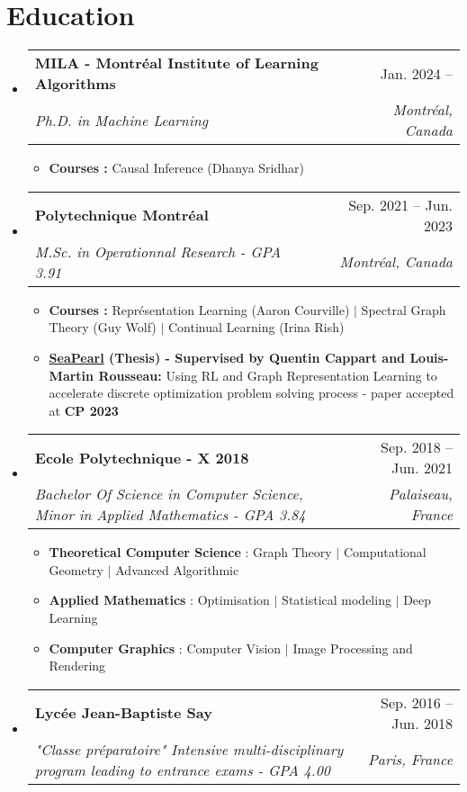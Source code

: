 \documentclass[letterpaper,11pt]{article}
\makeatletter
\newcommand{\resumeSubheading}[4]{
  \vspace{-2pt}\item
    \begin{tabular*}{0.97\textwidth}[t]{l@{\extracolsep{\fill}}r}
      \textbf{#1} & #2 \\
      \textit{\small#3} & \textit{\small #4} \\
    \end{tabular*}\vspace{-7pt}
}
\newcommand{\resumeSubHeadingListStart}{\begin{itemize}[leftmargin=0.15in, label={}]}
\newcommand{\resumeSubHeadingListEnd}{\end{itemize}}
\makeatother
\begin{document}
\section{Education}
  \resumeSubHeadingListStart
        \resumeSubheading
      {MILA - Montréal Institute of Learning Algorithms}{Jan. 2024 -- }
      {Ph.D. in Machine Learning}{Montréal, Canada}
      \vspace{.2pt}
      \begin{itemize}
          \item \textbf{Courses :} Causal Inference (Dhanya Sridhar)
      \end{itemize}
      \resumeSubheading
      {Polytechnique Montréal}{Sep. 2021 -- Jun. 2023}
      {M.Sc. in Operationnal Research - GPA 3.91}{Montréal, Canada}
      \vspace{.2pt}
      \begin{itemize}
          \item \textbf{Courses :} Représentation Learning (Aaron Courville) $|$ Spectral Graph Theory (Guy Wolf) $|$ Continual Learning (Irina Rish)  
          \item \textbf{\href{https://github.com/corail-research/SeaPearl.jl}{SeaPearl} (Thesis) - Supervised by Quentin Cappart and Louis-Martin Rousseau:} Using RL and Graph Representation Learning to accelerate discrete optimization problem solving process - paper accepted at \textbf{CP 2023}
      \end{itemize}
    \resumeSubheading
      {Ecole Polytechnique - X 2018}{Sep. 2018 -- Jun. 2021}
      {Bachelor Of Science in Computer Science, Minor in Applied Mathematics - GPA 3.84}{Palaiseau, France}
      \vspace{.2pt}
      \begin{itemize}
          \item \textbf{Theoretical Computer Science} : Graph Theory $|$ Computational Geometry $|$ Advanced Algorithmic
          \item \textbf{Applied Mathematics} : Optimisation $|$ Statistical modeling $|$ Deep Learning
          \item \textbf{Computer Graphics} : Computer Vision $|$ Image Processing and Rendering
      \end{itemize}
    \resumeSubheading
      {Lycée Jean-Baptiste Say}{Sep. 2016 -- Jun. 2018}
      {"Classe préparatoire" Intensive multi-disciplinary program leading to entrance exams - GPA 4.00}{Paris, France} 
  \resumeSubHeadingListEnd


\end{document}
